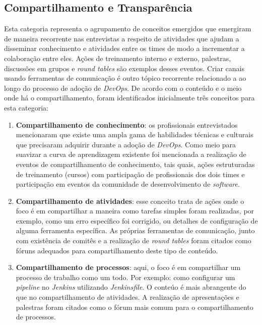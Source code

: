 \subsection{Compartilhamento e Transparência}

Esta categoria representa o agrupamento de conceitos emergidos que emergiram de
maneira recorrente nas entrevistas a respeito de atividades que ajudam a
disseminar conhecimento e atividades entre os times de modo a incrementar a
colaboração entre eles. Ações de treinamento interno e externo, palestras,
discussões em grupos e {\it round tables} são exemplos desses eventos. Criar
canais usando ferramentas de comunicação é outro tópico recorrente relacionado
a  ao longo do processo de adoção de
{\it DevOps}. De acordo com o conteúdo e o meio onde há o compartilhamento,
foram identificados inicialmente três conceitos para esta categoria:

\begin{enumerate}
\item {\bf Compartilhamento de conhecimento}: os profissionais entrevistados
mencionaram que existe uma ampla gama de habilidades técnicas e culturais que
precisaram adquirir durante a adoção de {\it DevOps}. Como meio para suavizar a
curva de aprendizagem existente foi mencionada a realização de eventos de
compartilhamento de conhecimento, tais quais, ações estruturadas de treinamento
(cursos) com participação de profissionais dos dois times e participação em
eventos da comunidade de desenvolvimento de {\it software}.

\item {\bf Compartilhamento de atividades}: esse conceito trata de ações onde o
foco é em compartilhar a maneira como tarefas simples foram realizadas, por
exemplo, como um erro específico foi corrigido, ou detalhes de configuração de
alguma ferramenta específica. As próprias ferramentas de comunicação, junto com
existência de comitês e a realização de {\it round tables} foram citados como
fóruns adequados para compartilhamento deste tipo de conteúdo.

\item {\bf Compartilhamento de processos}: aqui, o foco é em compartilhar um
processo de trabalho como um todo. Por exemplo: como configurar um {\it pipeline}
no {\it Jenkins} utilizando {\it Jenkinsfile}. O conteúo é mais abrangente do
que no compartilhamento de atividades. A realização de apresentações e palestras
foram citados como o fórum mais comum para o compartilhamento de processos.
\end{enumerate}

